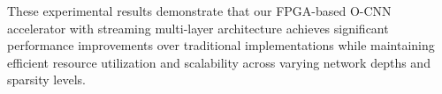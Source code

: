 \documentclass[sigconf, screen]{acmart}
\begin{document}
These experimental results demonstrate that our FPGA-based O-CNN accelerator with streaming multi-layer architecture achieves significant performance improvements over traditional implementations while maintaining efficient resource utilization and scalability across varying network depths and sparsity levels.


\end{document}
